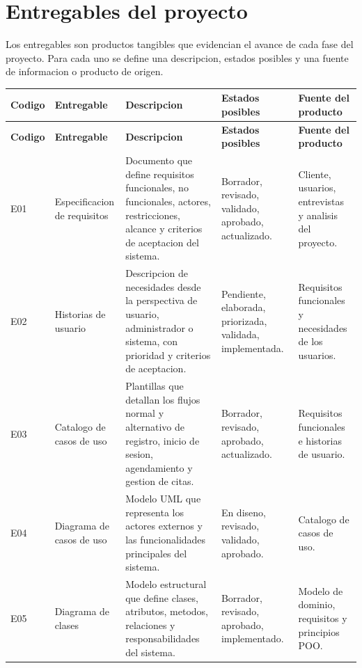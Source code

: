 \documentclass[12pt,letterpaper]{article}
\begin{document}
\section{Entregables del proyecto}

Los entregables son productos tangibles que evidencian el avance de cada fase del proyecto. Para cada uno se define una descripcion, estados posibles y una fuente de informacion o producto de origen.

\begin{longtable}{|p{1.2cm}|p{3.2cm}|p{5.4cm}|p{3.2cm}|p{3.2cm}|}
\hline
\textbf{Codigo} & \textbf{Entregable} & \textbf{Descripcion} & \textbf{Estados posibles} & \textbf{Fuente del producto} \\
\hline
\endfirsthead
\hline
\textbf{Codigo} & \textbf{Entregable} & \textbf{Descripcion} & \textbf{Estados posibles} & \textbf{Fuente del producto} \\
\hline
\endhead
\hline
\endfoot
\hline
\endlastfoot

E01 & Especificacion de requisitos & Documento que define requisitos funcionales, no funcionales, actores, restricciones, alcance y criterios de aceptacion del sistema. & Borrador, revisado, validado, aprobado, actualizado. & Cliente, usuarios, entrevistas y analisis del proyecto. \\
\hline

E02 & Historias de usuario & Descripcion de necesidades desde la perspectiva de usuario, administrador o sistema, con prioridad y criterios de aceptacion. & Pendiente, elaborada, priorizada, validada, implementada. & Requisitos funcionales y necesidades de los usuarios. \\
\hline

E03 & Catalogo de casos de uso & Plantillas que detallan los flujos normal y alternativo de registro, inicio de sesion, agendamiento y gestion de citas. & Borrador, revisado, aprobado, actualizado. & Requisitos funcionales e historias de usuario. \\
\hline

E04 & Diagrama de casos de uso & Modelo UML que representa los actores externos y las funcionalidades principales del sistema. & En diseno, revisado, validado, aprobado. & Catalogo de casos de uso. \\
\hline

E05 & Diagrama de clases & Modelo estructural que define clases, atributos, metodos, relaciones y responsabilidades del sistema. & Borrador, revisado, aprobado, implementado. & Modelo de dominio, requisitos y principios POO. \\
\hline


\end{longtable}
\end{document}
